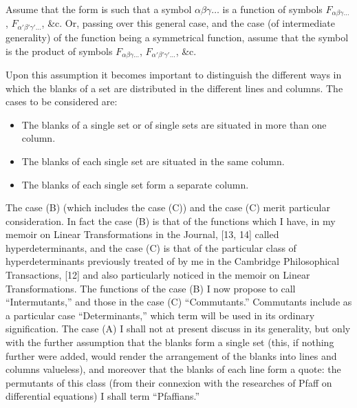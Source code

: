 \documentclass[11pt,a4paper]{book}
\begin{document}
Assume that the form is such that a symbol $\alpha\beta\gamma\ldots$ is a function of symbols $F_{\alpha\beta\gamma\ldots}$, $F_{\alpha'\beta'\gamma'\ldots}$, \&c. Or, passing over this general case, and the case (of intermediate generality) of the function being a symmetrical function, assume that the symbol is the product of symbols $F_{\alpha\beta\gamma\ldots}$, $F_{\alpha'\beta'\gamma'\ldots}$, \&c.

Upon this assumption it becomes important to distinguish the different ways in which the blanks of a set are distributed in the different lines and columns. The cases to be considered are:
\begin{itemize}
\item[(A).] The blanks of a single set or of single sets are situated in more than one column.
\item[(B).] The blanks of each single set are situated in the same column.
\item[(C).] The blanks of each single set form a separate column.
\end{itemize}

The case (B) (which includes the case (C)) and the case (C) merit particular consideration. In fact the case (B) is that of the functions which I have, in my memoir on Linear Transformations in the Journal, [13, 14] called hyperdeterminants, and the case (C) is that of the particular class of hyperdeterminants previously treated of by me in the Cambridge Philosophical Transactions, [12] and also particularly noticed in the memoir on Linear Transformations. The functions of the case (B) I now propose to call ``Intermutants,'' and those in the case (C) ``Commutants.'' Commutants include as a particular case ``Determinants,'' which term will be used in its ordinary signification. The case (A) I shall not at present discuss in its generality, but only with the further assumption that the blanks form a single set (this, if nothing further were added, would render the arrangement of the blanks into lines and columns valueless), and moreover that the blanks of each line form a quote: the permutants of this class (from their connexion with the researches of Pfaff on differential equations) I shall term ``Pfaffians.''
\end{document}
